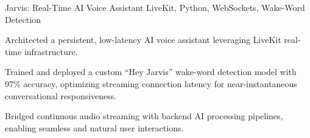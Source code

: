 \resumeSubheading
  {Jarvis: Real-Time AI Voice Assistant}{}
  {LiveKit, Python, WebSockets, Wake-Word Detection}{}
  \resumeItemListStart
    \item \small{Architected a persistent, low-latency AI voice assistant leveraging LiveKit real-time infrastructure.}
    \item \small{Trained and deployed a custom ``Hey Jarvis'' wake-word detection model with 97\% accuracy, optimizing streaming connection latency for near-instantaneous conversational responsiveness.}
    \item \small{Bridged continuous audio streaming with backend AI processing pipelines, enabling seamless and natural user interactions.}
  \resumeItemListEnd
